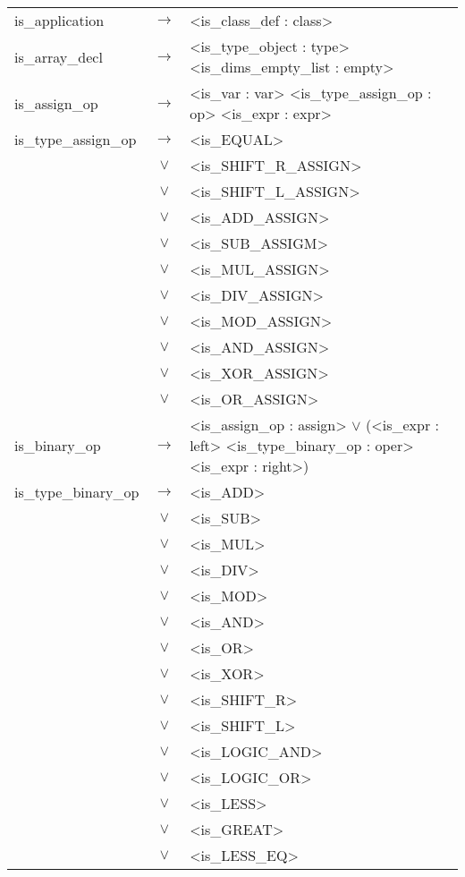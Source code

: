 \documentclass[a4paper]{article}
\begin{document}
\cleardoublepage
\begin{longtable}{lcl}
	is\_application				& $\to$ & <is\_class\_def : class> \\
	is\_array\_decl 			& $\to$ & <is\_type\_object : type> <is\_dims\_empty\_list : empty> \\
	is\_assign\_op				& $\to$ & <is\_var : var> <is\_type\_assign\_op : op> <is\_expr : expr> \\
	is\_type\_assign\_op		& $\to$ & <is\_EQUAL> \\
								& $\vee$ & <is\_SHIFT\_R\_ASSIGN> \\
								& $\vee$ & <is\_SHIFT\_L\_ASSIGN> \\
								& $\vee$ & <is\_ADD\_ASSIGN> \\
								& $\vee$ & <is\_SUB\_ASSIGM> \\
								& $\vee$ & <is\_MUL\_ASSIGN> \\
								& $\vee$ & <is\_DIV\_ASSIGN> \\
								& $\vee$ & <is\_MOD\_ASSIGN> \\
								& $\vee$ & <is\_AND\_ASSIGN> \\
								& $\vee$ & <is\_XOR\_ASSIGN> \\
								& $\vee$ & <is\_OR\_ASSIGN> \\
	is\_binary\_op				& $\to$ & <is\_assign\_op : assign> $\vee$ (<is\_expr : left> <is\_type\_binary\_op : oper> <is\_expr : right>) \\
	is\_type\_binary\_op		& $\to$ & <is\_ADD> \\
								& $\vee$ & <is\_SUB> \\
								& $\vee$ & <is\_MUL> \\
								& $\vee$ & <is\_DIV> \\
								& $\vee$ & <is\_MOD> \\
								& $\vee$ & <is\_AND> \\
								& $\vee$ & <is\_OR> \\
								& $\vee$ & <is\_XOR> \\
								& $\vee$ & <is\_SHIFT\_R>\\
								& $\vee$ & <is\_SHIFT\_L> \\
								& $\vee$ & <is\_LOGIC\_AND>\\
								& $\vee$ & <is\_LOGIC\_OR> \\
								& $\vee$ & <is\_LESS> \\
								& $\vee$ & <is\_GREAT> \\
								& $\vee$ & <is\_LESS\_EQ> \\

\end{longtable}
\end{document}
